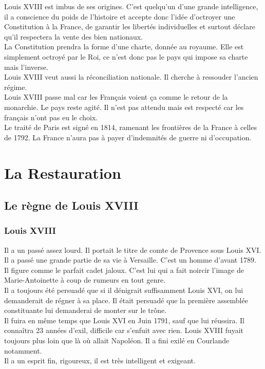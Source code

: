 \documentclass[10pt, a4paper, openany]{book}
\begin{document}
Louis XVIII est imbus de ses origines. C'est quelqu'un d'une grande intelligence, il a conscience du poids de l'histoire et accepte donc l'idée d'octroyer une Constitution à la France, de garantir les libertés individuelles et surtout déclare qu'il respectera la vente des bien nationaux. \\
La Constitution prendra la forme d'une charte, donnée au royaume. Elle est simplement octroyé par le Roi, ce n'est donc pas le pays qui impose sa charte mais l'inverse. \\
Louis XVIII veut aussi la réconciliation nationale. Il cherche à ressouder l'ancien régime. \\
Louis XVIII passe mal car les Français voient ça comme le retour de la monarchie. Le pays reste agité. Il n'est pas attendu mais est respecté car les français n'ont pas eu le choix. \\
Le traité de Paris est signé en 1814, ramenant les frontières de la France à celles de 1792. La France n'aura pas à payer d'indemnités de guerre ni d'occupation. 

\section{La Restauration}

\subsection{Le règne de Louis XVIII}

\subsubsection{Louis XVIII}

Il a un passé assez lourd. Il portait le titre de comte de Provence sous Louis XVI. Il a passé une grande partie de sa vie à Versaille. C'est un homme d'avant 1789. Il figure comme le parfait cadet jaloux. C'est lui qui a fait noircir l'image de Marie-Antoinette à coup de rumeurs en tout genre. \\
Il a toujours été persuadé que si il dénigrait suffisamment Louis XVI, on lui demanderait de régner à sa place. Il était persuadé que la première assemblée constituante lui demanderai de monter sur le trône. \\
Il fuira en même temps que Louis XVI en Juin 1791, sauf que lui réussira. Il connaîtra 23 années d'exil, difficile car s'enfuit avec rien. Louis XVIII fuyait toujours plus loin que là où allait Napoléon. Il a fini exilé en Courlande notamment. \\
Il a un esprit fin, rigoureux, il est très intelligent et exigeant.
\end{document}
